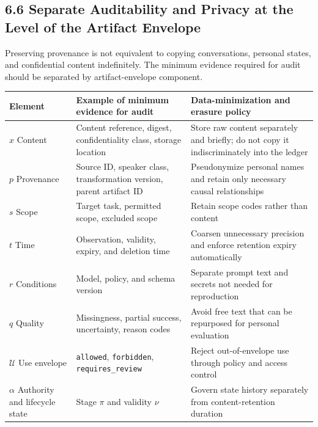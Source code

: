\subsection{6.6 Separate Auditability and Privacy at the Level of the Artifact Envelope}\label{separate-auditability-and-privacy-at-the-level-of-the-artifact-envelope}

Preserving provenance is not equivalent to copying conversations, personal states, and confidential content indefinitely. The minimum evidence required for audit should be separated by artifact-envelope component.

{\def\LTcaptype{none} %
\begin{longtable}[]{@{}
  >{\raggedright\arraybackslash}p{}
  >{\raggedright\arraybackslash}p{}
  >{\raggedright\arraybackslash}p{}@{}}
\toprule\noalign{}
\begin{minipage}[b]{\linewidth}\raggedright
Element
\end{minipage} & \begin{minipage}[b]{\linewidth}\raggedright
Example of minimum evidence for audit
\end{minipage} & \begin{minipage}[b]{\linewidth}\raggedright
Data-minimization and erasure policy
\end{minipage} \\
\midrule\noalign{}
\endhead
\bottomrule\noalign{}
\endlastfoot
\(x\) Content & Content reference, digest, confidentiality class, storage location & Store raw content separately and briefly; do not copy it indiscriminately into the ledger \\
\(p\) Provenance & Source ID, speaker class, transformation version, parent artifact ID & Pseudonymize personal names and retain only necessary causal relationships \\
\(s\) Scope & Target task, permitted scope, excluded scope & Retain scope codes rather than content \\
\(t\) Time & Observation, validity, expiry, and deletion time & Coarsen unnecessary precision and enforce retention expiry automatically \\
\(r\) Conditions & Model, policy, and schema version & Separate prompt text and secrets not needed for reproduction \\
\(q\) Quality & Missingness, partial success, uncertainty, reason codes & Avoid free text that can be repurposed for personal evaluation \\
\(\mathcal U\) Use envelope & \passthrough{\lstinline!allowed!}, \passthrough{\lstinline!forbidden!}, \texttt{requires\_\allowbreak{}review} & Reject out-of-envelope use through policy and access control \\
\(\alpha\) Authority and lifecycle state & Stage \(\pi\) and validity \(\nu\) & Govern state history separately from content-retention duration \\
\end{longtable}
}

